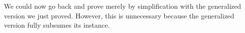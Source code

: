 \begin{isabellebody}
\begin{isamarkuptext}
We could now go back and prove 
merely by simplification with the generalized version we just proved.
However, this is unnecessary because the generalized version fully subsumes
its instance.%
%
\end{isamarkuptext}%
\isamarkuptrue%
\isamarkupfalse%
\isamarkupfalse%
\isamarkupfalse%
\end{isabellebody}%
